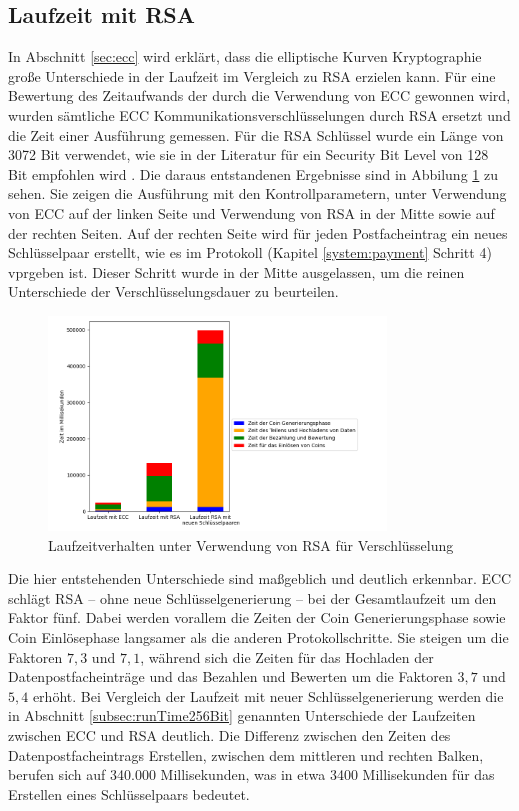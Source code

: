 \documentclass[
	fontsize=12pt,
	headings=small,
	parskip=half,           %
	bibliography=totoc,
	numbers=noenddot,       %
	open=any,               %
]{scrreprt}
\begin{document}
\subsection{Laufzeit mit RSA}
\label{subsec:runTimeRSA}
In Abschnitt \ref{sec:ecc} wird erklärt, dass die elliptische Kurven Kryptographie große Unterschiede in der Laufzeit im Vergleich zu RSA erzielen kann. Für eine Bewertung des Zeitaufwands der durch die Verwendung von ECC gewonnen wird, wurden sämtliche ECC Kommunikationsverschlüsselungen durch RSA ersetzt und die Zeit einer Ausführung gemessen. Für die RSA Schlüssel wurde ein Länge von 3072 Bit verwendet, wie sie in der Literatur für ein Security Bit Level von 128 Bit empfohlen wird \cite{elaine2016recommendation}. Die daraus entstandenen Ergebnisse sind in Abbilung \ref{fig:win_rsa} zu sehen. Sie zeigen die Ausführung mit den Kontrollparametern, unter Verwendung von ECC auf der linken Seite und Verwendung von RSA in der Mitte sowie auf der rechten Seiten. Auf der rechten Seite wird für jeden Postfacheintrag ein neues Schlüsselpaar erstellt, wie es im Protokoll (Kapitel \ref{system:payment} Schritt 4) vprgeben ist. Dieser Schritt wurde in der Mitte ausgelassen, um die reinen Unterschiede der Verschlüsselungsdauer zu beurteilen.

\begin{figure}[h]
    \caption{Laufzeitverhalten unter Verwendung von RSA für Verschlüsselung}
    \label{fig:win_rsa}
    \centering
    \includegraphics[width=0.8\textwidth]{figure_win_RSA.png}
\end{figure}
Die hier entstehenden Unterschiede sind maßgeblich und deutlich erkennbar. ECC schlägt RSA -- ohne neue Schlüsselgenerierung -- bei der Gesamtlaufzeit um den Faktor fünf. Dabei werden vorallem die Zeiten der Coin Generierungsphase sowie Coin Einlösephase langsamer als die anderen Protokollschritte. Sie steigen um die Faktoren $7,3$ und $7,1$, während sich die Zeiten für das Hochladen der Datenpostfacheinträge und das Bezahlen und Bewerten um die Faktoren $3,7$ und $5,4$ erhöht. Bei Vergleich der Laufzeit mit neuer Schlüsselgenerierung werden die in Abschnitt \ref{subsec:runTime256Bit} genannten Unterschiede der Laufzeiten zwischen ECC und RSA deutlich. Die Differenz zwischen den Zeiten des Datenpostfacheintrags Erstellen, zwischen dem mittleren und rechten Balken, berufen sich auf 340.000 Millisekunden, was in etwa 3400 Millisekunden für das Erstellen eines Schlüsselpaars bedeutet.
\end{document}

